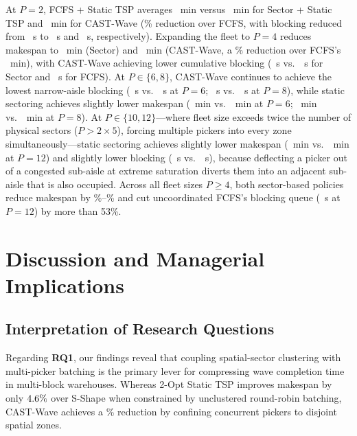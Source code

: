 \documentclass[conference]{IEEEtran}
\begin{document}
At $P = 2$, FCFS + Static TSP averages \DenseMkFCFSTwo~min versus \DenseMkSectorTwo~min for Sector + Static TSP and \DenseMkCASTTwo~min for CAST-Wave (\DenseRedCASTvsFCFSTwo\% reduction over FCFS, with blocking reduced from \DenseBlockedFCFSTwo~s to \DenseBlockedSectorTwo~s and \DenseBlockedCASTTwo~s, respectively). Expanding the fleet to $P = 4$ reduces makespan to \DenseMkSectorFour~min (Sector) and \DenseMkCASTFour~min (CAST-Wave, a \DenseRedCASTvsFCFSFour\% reduction over FCFS's \DenseMkFCFSFour~min), with CAST-Wave achieving lower cumulative blocking (\DenseBlockedCASTFour~s vs.\ \DenseBlockedSectorFour~s for Sector and \DenseBlockedFCFSFour~s for FCFS). At $P \in \{6, 8\}$, CAST-Wave continues to achieve the lowest narrow-aisle blocking (\DenseBlockedCASTSix~s vs.\ \DenseBlockedSectorSix~s at $P=6$; \DenseBlockedCASTEight~s vs.\ \DenseBlockedSectorEight~s at $P=8$), while static sectoring achieves slightly lower makespan (\DenseMkSectorSix~min vs.\ \DenseMkCASTSix~min at $P=6$; \DenseMkSectorEight~min vs.\ \DenseMkCASTEight~min at $P=8$). At $P \in \{10, 12\}$---where fleet size exceeds twice the number of physical sectors ($P > 2 \times 5$), forcing multiple pickers into every zone simultaneously---static sectoring achieves slightly lower makespan (\DenseMkSectorTwelve~min vs.\ \DenseMkCASTTwelve~min at $P = 12$) and slightly lower blocking (\DenseBlockedSectorTwelve~s vs.\ \DenseBlockedCASTTwelve~s), because deflecting a picker out of a congested sub-aisle at extreme saturation diverts them into an adjacent sub-aisle that is also occupied. Across all fleet sizes $P \ge 4$, both sector-based policies reduce makespan by \DenseRedCASTvsFCFSTwelve\%--\DenseRedSectorvsFCFSTen\% and cut uncoordinated FCFS's blocking queue (\DenseBlockedFCFSTwelve~s at $P = 12$) by more than 53\%.

\section{Discussion and Managerial Implications}
\label{sec:discussion}

\subsection{Interpretation of Research Questions}
\label{sec:interp_rqs}
Regarding \textbf{RQ1}, our findings reveal that coupling spatial-sector clustering with multi-picker batching is the primary lever for compressing wave completion time in multi-block warehouses. Whereas 2-Opt Static TSP improves makespan by only $4.6\%$ over S-Shape when constrained by unclustered round-robin batching, CAST-Wave achieves a \MakespanRedSShapePct\% reduction by confining concurrent pickers to disjoint spatial zones.
\end{document}
